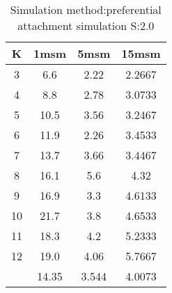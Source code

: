 \begin{table}[H]
\centering
\begin{tabular}{c|ccc}
K &1msm &5msm &15msm\\
\hline
3 & 6.6 & 2.22 & 2.2667\\
4 & 8.8 & 2.78 & 3.0733\\
5 & 10.5 & 3.56 & 3.2467\\
6 & 11.9 & 2.26 & 3.4533\\
7 & 13.7 & 3.66 & 3.4467\\
8 & 16.1 & 5.6 & 4.32\\
9 & 16.9 & 3.3 & 4.6133\\
10 & 21.7 & 3.8 & 4.6533\\
11 & 18.3 & 4.2 & 5.2333\\
12 & 19.0 & 4.06 & 5.7667\\
\hline
& 14.35 & 3.544 & 4.0073\\
\end{tabular}
\caption{Simulation method:preferential attachment simulation S:2.0}
\label{tab:s2.0}
\end{table}

